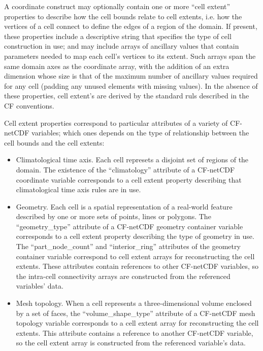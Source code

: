 
A coordinate construct may optionally contain one or more ``cell
extent'' properties to describe how the cell bounds relate to cell
extents, i.e. how the vertices of a cell connect to define the edges
of a region of the domain. If present, these properties include a
descriptive string that specifies the type of cell construction in
use; and may include arrays of ancillary values that contain
parameters needed to map each cell's vertices to its extent. Such
arrays span the same domain axes as the coordinate array, with the
addition of an extra dimension whose size is that of the maximum
number of ancillary values required for any cell (padding any unused
elements with missing values). In the absence of these properties,
cell extent's are derived by the standard ruls described in the CF
conventions.

Cell extent properties correspond to particular attributes of a
variety of CF-netCDF variables; which ones depends on the type of
relationship between the cell bounds and the cell extents:

\begin{itemize}

\item Climatological time axis. Each cell represets a disjoint set of
  regions of the domain. The existence of the ``climatology''
  attribute of a CF-netCDF coordinate variable corresponds to a cell
  extent property describing that climatological time axis rules are
  in use.
  
\item Geometry. Each cell is a spatial representation of a real-world
  feature described by one or more sets of points, lines or
  polygons. The ``geometry\_type'' attribute of a CF-netCDF geometry
  container variable corresponds to a cell extent property describing
  the type of geometry in use. The ``part\_node\_count'' and
  ``interior\_ring'' attributes of the geometry container variable
  correspond to cell extent arrays for reconstructing the cell
  extents. These attributes contain references to other CF-netCDF
  variables, so the intra-cell connectivity arrays are constructed
  from the referenced variables' data.

\item Mesh topology. When a cell represents a three-dimensional volume
  enclosed by a set of faces, the ``volume\_shape\_type'' attribute of
  a CF-netCDF mesh topology variable corresponds to a cell extent
  array for reconstructing the cell extents. This attribute contains a
  reference to another CF-netCDF variable, so the cell extent array is
  constructed from the referenced variable's data.
  
\end{itemize}

